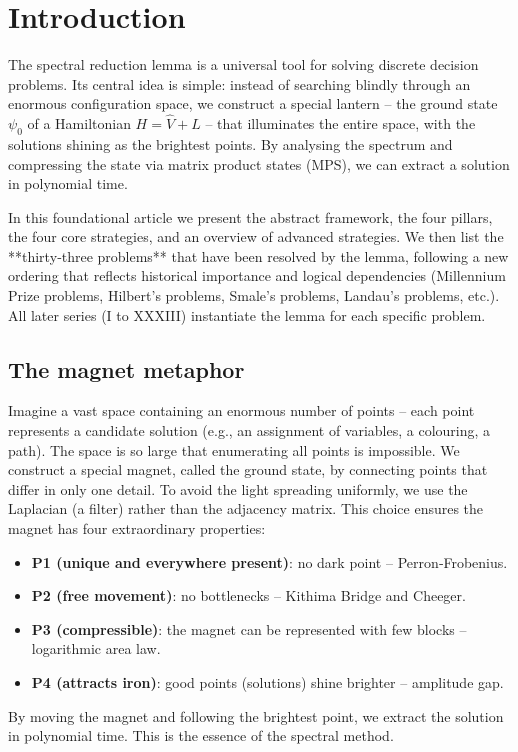\documentclass[11pt,a4paper]{article}
\begin{document}
\tableofcontents

\section{Introduction}

The spectral reduction lemma is a universal tool for solving discrete decision problems. Its central idea is simple: instead of searching blindly through an enormous configuration space, we construct a special lantern – the ground state \(\psi_0\) of a Hamiltonian \(H = \hat{V} + L\) – that illuminates the entire space, with the solutions shining as the brightest points. By analysing the spectrum and compressing the state via matrix product states (MPS), we can extract a solution in polynomial time.

In this foundational article we present the abstract framework, the four pillars, the four core strategies, and an overview of advanced strategies. We then list the **thirty‑three problems** that have been resolved by the lemma, following a new ordering that reflects historical importance and logical dependencies (Millennium Prize problems, Hilbert's problems, Smale's problems, Landau's problems, etc.). All later series (I to XXXIII) instantiate the lemma for each specific problem.

\subsection{The magnet metaphor}

Imagine a vast space containing an enormous number of points – each point represents a candidate solution (e.g., an assignment of variables, a colouring, a path). The space is so large that enumerating all points is impossible. We construct a special magnet, called the ground state, by connecting points that differ in only one detail. To avoid the light spreading uniformly, we use the Laplacian (a filter) rather than the adjacency matrix. This choice ensures the magnet has four extraordinary properties:

\begin{itemize}
\item \textbf{P1 (unique and everywhere present)}: no dark point – Perron‑Frobenius.
\item \textbf{P2 (free movement)}: no bottlenecks – Kithima Bridge and Cheeger.
\item \textbf{P3 (compressible)}: the magnet can be represented with few blocks – logarithmic area law.
\item \textbf{P4 (attracts iron)}: good points (solutions) shine brighter – amplitude gap.
\end{itemize}
By moving the magnet and following the brightest point, we extract the solution in polynomial time. This is the essence of the spectral method.
\end{document}
